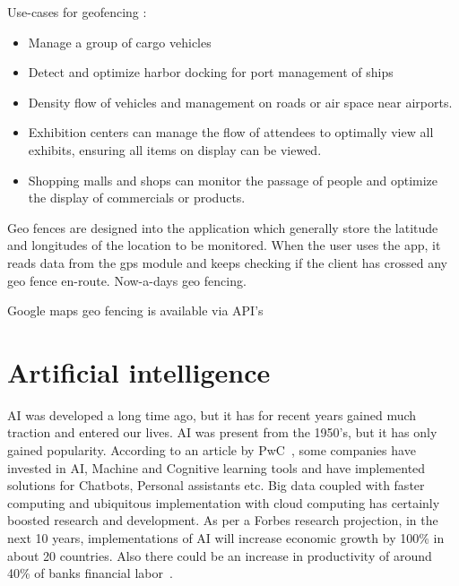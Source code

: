 Use-cases for geofencing :
\begin{itemize}
	\item Manage a group of cargo vehicles
	\item Detect and optimize harbor docking for port management of ships
	\item Density flow of vehicles and management on roads or air space near airports.
	\item Exhibition centers can manage the flow of attendees to optimally view all exhibits, ensuring all items on display can be viewed.
	\item Shopping malls and shops can monitor the passage of people and optimize the display of commercials or products.
\end{itemize}

Geo fences are designed into the application which generally store the latitude and longitudes of the location to be monitored. When the user uses the app, it reads data from the gps module and keeps checking if the client has crossed any geo fence en-route. Now-a-days geo fencing.

Google maps geo fencing is available via API's 

\newpage
\section{Artificial intelligence}
AI was developed a long time ago, but it has for recent years gained much traction and entered our lives. AI was present from the 1950's, but it has only gained popularity.
According to an article by PwC~, some companies have invested in AI, Machine and Cognitive learning tools and have implemented solutions for Chatbots, Personal assistants etc. Big data coupled with faster computing and ubiquitous implementation with cloud computing has certainly boosted research and development.
As per a Forbes research projection, in the next 10 years, implementations of AI will increase economic growth by 100\% in about 20 countries. Also there could be an increase in productivity of around 40\% of banks financial labor~.

